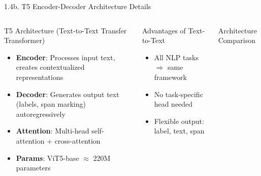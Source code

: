 \documentclass[11pt, aspectratio=169]{beamer}
\begin{document}
\begin{frame}[fragile, shrink=20]{1.4b. T5 Encoder-Decoder Architecture Details}

\begin{columns}[T]
  \begin{block}{T5 Architecture (Text-to-Text Transfer Transformer)}
    \begin{itemize}
      \item \textbf{Encoder}: Processes input text, creates contextualized representations
      \item \textbf{Decoder}: Generates output text (labels, span marking) autoregressively
      \item \textbf{Attention}: Multi-head self-attention + cross-attention
      \item \textbf{Params}: ViT5-base $\approx$ 220M parameters
    \end{itemize}
  \end{block}

  \vspace{0.2cm}
  \begin{block}{Advantages of Text-to-Text}
    \begin{itemize}
      \item All NLP tasks $\Rightarrow$ same framework
      \item No task-specific head needed
      \item Flexible output: label, text, span
    \end{itemize}
  \end{block}

  \begin{block}{Architecture Comparison}
    \centering
  \end{block}


\end{columns}
\end{frame}
\end{document}
